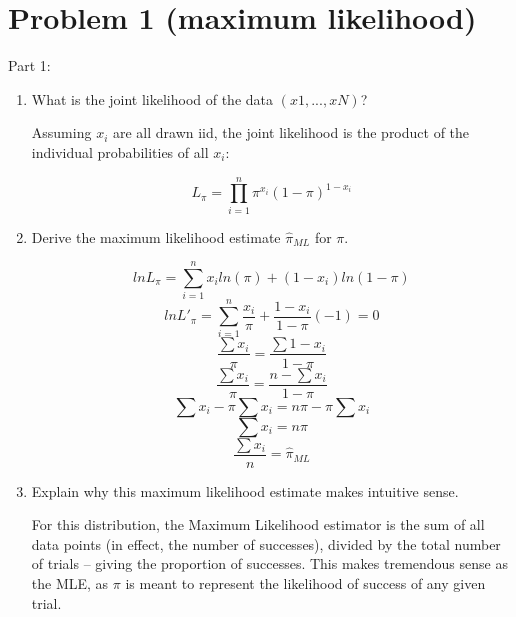\documentclass[11pt]{article}
\begin{document}

\section*{Problem 1 (maximum likelihood)}

Part 1:
\begin{enumerate}
\item What is the joint likelihood of the data $(x1,...,xN)$?

Assuming $x_i$ are all drawn iid, the joint likelihood is the product of the individual probabilities of all $x_i$:

\[
L_{\pi} = \prod_{i=1}^{n} \pi^{x_i}(1-\pi)^{1-x_i}
\]

\item Derive the maximum likelihood estimate $\hat \pi_{ML}$ for $\pi$.

\[
ln L_{\pi} = \sum_{i=1}^{n} x_i ln(\pi) + (1-x_{i}) ln(1-\pi)
\]
\[
ln L\prime_{\pi} = \sum_{i=1}^{n} \frac{x_i}{\pi} + \frac{1 - x_i}{1-\pi}(-1) = 0
\]
\[
 \frac{\sum x_i}{\pi} = \frac{\sum 1 - x_i}{1-\pi}
\]
\[
 \frac{\sum x_i}{\pi} = \frac{n - \sum x_i}{1-\pi}
\]
\[
\sum x_i - \pi \sum x_i  = n\pi - \pi \sum x_i
\]
\[
\sum x_i  = n\pi
\]
\[
\frac{\sum x_i}{n}  = \hat \pi_{ML}
\]

\item Explain why this maximum likelihood estimate makes intuitive sense.

For this distribution, the Maximum Likelihood estimator is the sum of all data points (in effect, the number of successes), divided by the total number of trials -- giving the proportion of successes. This makes tremendous sense as the MLE, as $\pi$ is meant to represent the likelihood of success of any given trial.

\end{enumerate}
\end{document}
